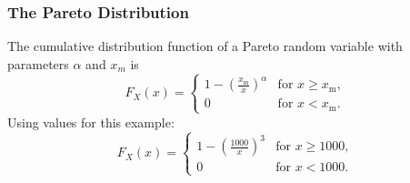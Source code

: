 \documentclass{beamer}
\begin{document}
\begin{frame}
\frametitle{The Pareto Distribution}
\Large
\vspace{-1.2cm}
The cumulative distribution function of a Pareto random variable with parameters $\alpha$ and $x_m$ is
\[
F_X(x) = \begin{cases}
1-\left(\frac{x_\mathrm{m}}{x}\right)^\alpha & \text{for } x \ge x_\mathrm{m}, \\
0 & \text{for }x < x_\mathrm{m}.
\end{cases}
\]
Using values for this example:
\[
F_X(x) = \begin{cases}
1-\left(\frac{1000}{x}\right)^3 & \text{for } x \ge 1000, \\
0 & \text{for }x < 1000.
\end{cases}
\]

\end{frame}
\end{document}
